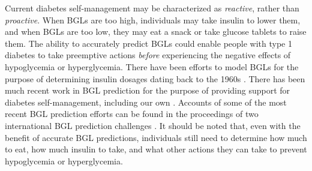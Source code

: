 \documentclass[journal,article,submit,moreauthors,pdftex]{Definitions/mdpi}
\begin{document}
Current diabetes self-management may be characterized as \emph{reactive}, rather than \emph{proactive}.  When BGLs are too high, individuals may take insulin to lower them, and when BGLs are too low, they may eat a snack or take glucose tablets to raise them.  The ability to accurately predict BGLs could enable people with type 1 diabetes to take preemptive actions \emph{before} experiencing the negative effects of hypoglycemia or hyperglycemia.  There have been efforts to model BGLs for the purpose of determining insulin dosages dating back to the 1960s \cite{boutayeb2016}.  There has been much recent work in BGL prediction for the purpose of providing support for diabetes self-management, including our own \cite{bunescu:icmla13,plis:maiha14}.  Accounts of some of the most recent BGL prediction efforts can be found in the proceedings of two international BGL prediction challenges \cite{kdh-2018-proceedings,kdh-2020-proceedings}.  It should be noted that, even with the benefit of accurate BGL predictions, individuals still need to determine how much to eat, how much insulin to take, and what other actions they can take to prevent hypoglycemia or hyperglycemia.
\end{document}
